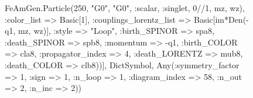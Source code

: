 \documentclass{revtex4}
\begin{document}
\begin{figure}[!htb]
\begin{center}
{FeAmGen.Particle(250, "G0", "G0", :scalar, :singlet, 0//1, mz, wz), :color_list => Basic[1], :couplings_lorentz_list => Basic[im*Den(-q1, mz, wz)], :style => "Loop", :birth_SPINOR => spa8, :death_SPINOR => spb8, :momentum => -q1, :birth_COLOR => cla8, :propagator_index => 4, :death_LORENTZ => mub8, :death_COLOR => clb8))], Dict{Symbol, Any}(:symmetry_factor => 1, :sign => 1, :n_loop => 1, :diagram_index => 58, :n_out => 2, :n_inc => 2)) 
}
\end{center}
\end{figure}
\end{document}
